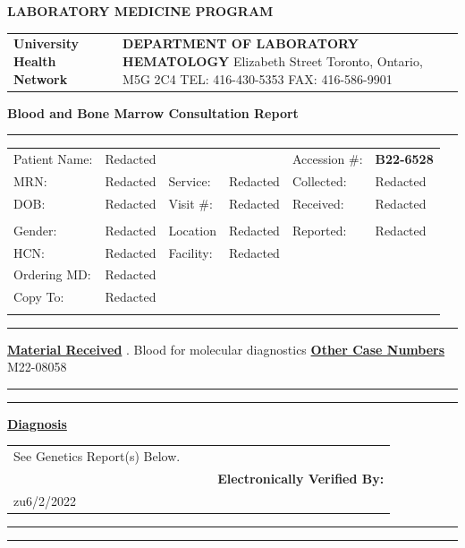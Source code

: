 \documentclass[9pt]{extarticle}
\begin{document}
\begin{center}{\LARGE \bf LABORATORY MEDICINE PROGRAM }\end{center}
\begin{tabular}{p{4cm} >{\centering \arraybackslash}p{11.59cm} p{10cm}}
{\Huge \bf University \newline Health \newline Network} & {\bf DEPARTMENT OF LABORATORY HEMATOLOGY} \newline
200 Elizabeth Street \newline Toronto, Ontario, M5G 2C4 \newline
TEL: 416-430-5353 \newline FAX: 416-586-9901\newline
\end{tabular}
\begin{center}{\Large \bf Blood and Bone Marrow Consultation Report  \hrule }\end{center}
\begin{tabular}{p{2.5cm} p{3.75cm} p{2.5cm} p{3.75cm} p{2.5cm} p{3.75cm}}
Patient Name: & Redacted & & & Accession \#: & {\bf B22-6528} \\
MRN: & Redacted & Service: & Redacted & Collected: & Redacted\\
DOB: & Redacted & Visit \#: & Redacted & Received: &  Redacted \\
& & & & & \\
Gender: & Redacted & Location & Redacted & Reported: & Redacted \\
HCN: & Redacted & Facility: & Redacted & & \\
Ordering MD: & Redacted & & & & \\
Copy To: & Redacted &&&&\\
& & & & & \\
\end{tabular}
\hrule
\begin{raggedright} {\bf \underline {Material Received}} . Blood for molecular diagnostics 
\newline
{\bf \underline {Other Case Numbers}}\\
M22-08058 \newline
\hrule
\end{raggedright}
\hrule

{\Large \underline{\bf Diagnosis}}\\
\begin{tabular}{p{5cm} p{3cm} p{2cm} p{5.75cm}}
See Genetics Report(s) Below. \newline & & & \\
&  & & {\bf Electronically Verified By:} \\
zu6/2/2022
\end{tabular}
\hrule
\hrule
\end{document}

